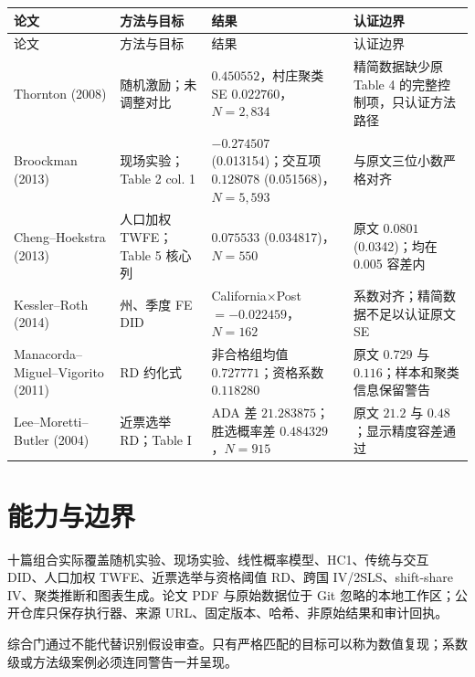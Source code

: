 \documentclass[UTF8,11pt]{ctexart}
\begin{document}
\begin{longtable}{p{2.7cm}p{3.1cm}p{4.2cm}p{4.5cm}}
\toprule
论文 & 方法与目标 & 结果 & 认证边界 \\
\midrule
\endfirsthead
\toprule
论文 & 方法与目标 & 结果 & 认证边界 \\
\midrule
\endhead
Thornton (2008) & 随机激励；未调整对比 & $0.450552$，村庄聚类 SE $0.022760$，$N=2,834$ & 精简数据缺少原 Table 4 的完整控制项，只认证方法路径 \\
Broockman (2013) & 现场实验；Table 2 col. 1 & $-0.274507$ (0.013154)；交互项 $0.128078$ (0.051568)，$N=5,593$ & 与原文三位小数严格对齐 \\
Cheng--Hoekstra (2013) & 人口加权 TWFE；Table 5 核心列 & $0.075533$ (0.034817)，$N=550$ & 原文 $0.0801$ (0.0342)；均在 0.005 容差内 \\
Kessler--Roth (2014) & 州、季度 FE DID & California$\times$Post $=-0.022459$，$N=162$ & 系数对齐；精简数据不足以认证原文 SE \\
Manacorda--Miguel--Vigorito (2011) & RD 约化式 & 非合格组均值 $0.727771$；资格系数 $0.118280$ & 原文 $0.729$ 与 $0.116$；样本和聚类信息保留警告 \\
Lee--Moretti--Butler (2004) & 近票选举 RD；Table I & ADA 差 $21.283875$；胜选概率差 $0.484329$，$N=915$ & 原文 $21.2$ 与 $0.48$；显示精度容差通过 \\
\bottomrule
\end{longtable}

\section{能力与边界}

十篇组合实际覆盖随机实验、现场实验、线性概率模型、HC1、传统与交互 DID、人口加权 TWFE、近票选举与资格阈值 RD、跨国 IV/2SLS、shift-share IV、聚类推断和图表生成。论文 PDF 与原始数据位于 Git 忽略的本地工作区；公开仓库只保存执行器、来源 URL、固定版本、哈希、非原始结果和审计回执。

综合门通过不能代替识别假设审查。只有严格匹配的目标可以称为数值复现；系数级或方法级案例必须连同警告一并呈现。
\end{document}
